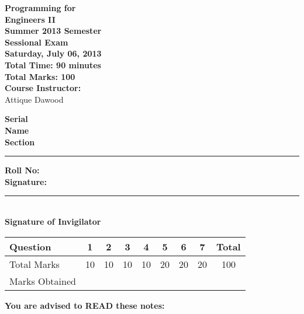 \documentclass[12pt,a4paper]{article}
\def\QOne{10}
\def\Qtwo{10}
\def\Qthree{10}
\def\Qfour{10}
\def\Qfive{20}
\def\Qsix{20}
\def\Qseven{20}
\def\TotalMarks{100}
\begin{document}
\begin{minipage}{0.55\textwidth}
{\LARGE \textbf{Programming for\\ Engineers II}}\\[0.15cm]
{\normalsize \textbf{Summer 2013 Semester}}\\
{\Large \textbf{Sessional Exam}}\\
{\normalsize \textbf{Saturday, July 06, 2013}}\\[0.30cm]
{\Large \textbf{Total Time: 90 minutes}}\\[0.15cm]
{\Large \textbf{Total Marks: 100}}\\
\textbf{Course Instructor:}\\
Attique Dawood\\
\end{minipage}
\begin{minipage}{0.4\textwidth}
\textbf{Serial} \hrulefill \\[0.25cm]
\textbf{Name} \hrulefill\\[0.25cm]
\textbf{Section} \rule{1cm}{0.2mm} \textbf{Roll No:} \hrulefill\\[0.25cm]
\textbf{Signature:} \hrulefill\\[0.25cm]
\rule{6.6cm}{0.2mm}\\
\textbf{Signature of Invigilator}\\[0.25cm]
\end{minipage}
\begin{table}[H]
\begin{center}
\vspace{0.3cm}
	{\large \begin{tabular}{|l|c|c|c|c|c|c|c|c|}
	\hline
		\rule{0pt}{2.6ex} Question & \textbf{1} & \textbf{2} & \textbf{3} & \textbf{4} & \textbf{5} & \textbf{6} & \textbf{7} & \textbf{Total}\\
		\hline
		Total Marks \rule{0pt}{2.6ex} & \QOne & \Qtwo & \Qthree & \Qfour & \Qfive & \Qsix & \Qseven & \TotalMarks\\
		\hline
		Marks Obtained \rule{0pt}{2.6ex} & & & & & & & &\\
	\hline
	\end{tabular}}
\end{center}
\end{table}
\noindent \textbf{You are advised to READ these notes:}
\end{document}
